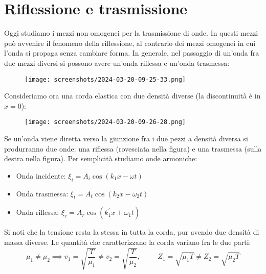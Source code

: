 \section{Riflessione e trasmissione}
Oggi studiamo i mezzi non omogenei per la trasmissione di onde. In questi mezzi può avvenire il fenomeno della riflessione, al contrario dei mezzi omogenei in cui l'onda si propaga senza cambiare forma. In generale, nel passaggio di un'onda fra due mezzi diversi si possono avere un'onda riflessa e un'onda trasmessa:


\begin{figure}[H]
	\centering
	\texttt{[image: screenshots/2024-03-20-09-25-33.png]}
\end{figure}

Consideriamo ora una corda elastica con due densità diverse (la discontinuità è in \(x=0\)):

\begin{figure}[H]
	\centering
	\texttt{[image: screenshots/2024-03-20-09-26-28.png]}
\end{figure}
Se un'onda viene diretta verso la giunzione fra i due pezzi a densità diversa si produrranno due onde: una riflessa (rovesciata nella figura) e una trasmessa (sulla destra nella figura). Per semplicità studiamo onde armoniche:

\begin{itemize}
	\item Onda incidente: \(\xi _i = A_i \cos (k_1 x -\omega t)\) 	
	\item Onda trasmessa: \(\xi _t = A_t \cos (k_2 x - \omega _2 t)\) 
	\item Onda riflessa: \(\xi _r = A_r \cos (k_1^{\prime} x + \omega _1 t)\) 
\end{itemize}

Si noti che la tensione resta la stessa in tutta la corda, pur avendo due densità di massa diverse. Le quantità che caratterizzano la corda variano fra le due parti:
\[
	\mu _1 \neq \mu _2 \implies v_1 = \sqrt{\frac{T}{\mu _1}} \neq v_2 = \sqrt{\frac{T}{\mu _2}},\hspace{1cm} Z_1=\sqrt{\mu _1 T}\neq Z_2 = \sqrt{\mu _2 T}   
\]

